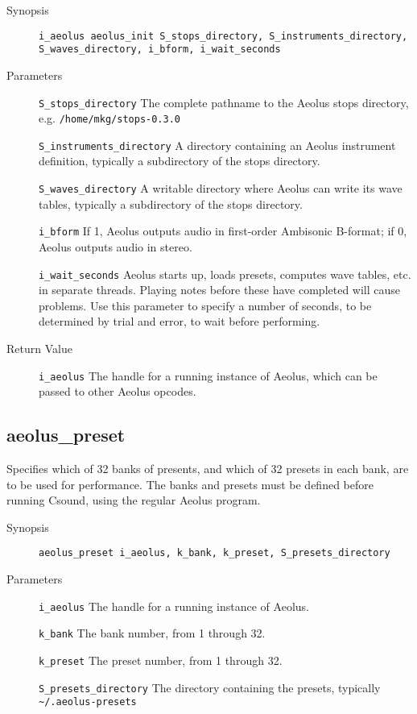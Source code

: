 \documentclass[english,11pt,letterpaper,onecolumn]{scrartcl}
\begin{document}
{\begin{description}
	\item[Synopsis]
	\item[]\lstinline|i_aeolus aeolus_init S_stops_directory, S_instruments_directory, S_waves_directory, i_bform, i_wait_seconds|
	\item[Parameters]
	\item[]\lstinline|S_stops_directory| The complete pathname to the Aeolus stops directory, e.g. \lstinline|/home/mkg/stops-0.3.0|
	\item[]\lstinline|S_instruments_directory| A directory containing an Aeolus instrument definition, typically a subdirectory of the stops directory.
	\item[]\lstinline|S_waves_directory| A writable directory where Aeolus can write its wave tables, typically a subdirectory of the stops directory.
	\item[]\lstinline|i_bform| If 1, Aeolus outputs audio in first-order Ambisonic B-format; if 0, Aeolus outputs audio in stereo.
	\item[]\lstinline|i_wait_seconds| Aeolus starts up, loads presets, computes wave tables, etc. in separate threads. Playing notes before these have completed will cause problems. Use this parameter to specify a number of seconds, to be determined by trial and error, to wait before performing.
	\item[Return Value]
	\item[]\lstinline|i_aeolus| The handle for a running instance of Aeolus, which can be passed to other Aeolus opcodes.
\end{description}

\subsection*{aeolus\_preset}

Specifies which of 32 banks of presents, and which of 32 presets in each bank, are to be used for performance. The banks and presets must be defined before running Csound, using the regular Aeolus program.

\begin{description}
	\item[Synopsis]
	\item[]\lstinline|aeolus_preset i_aeolus, k_bank, k_preset, S_presets_directory|
	\item[Parameters]
	\item[]\lstinline|i_aeolus| The handle for a running instance of Aeolus.
	\item[]\lstinline|k_bank| The bank number, from 1 through 32.
	\item[]\lstinline|k_preset| The preset number, from 1 through 32.
	\item[]\lstinline|S_presets_directory| The directory containing the presets, typically \lstinline|~/.aeolus-presets|
\end{description}

}
\end{document}
